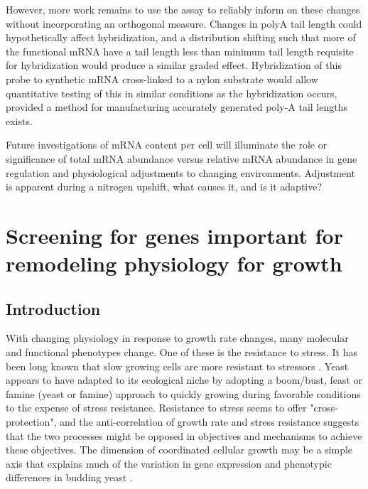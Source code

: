 However, more work remains to use the assay to reliably inform on
these changes without incorporating an orthogonal measure.
Changes in polyA tail length could hypothetically affect
hybridization, and a distribution shifting such that more of the
functional mRNA have a tail length less than minimum tail length
requisite for hybridization would produce a similar graded effect.
Hybridization of this probe to synthetic mRNA cross-linked to a nylon
substrate would allow quantitative testing of this in similar
conditions as the hybridization occurs, provided a method for
manufacturing accurately generated poly-A tail lengths exists.

Future investigations of mRNA content per cell will illuminate
the role or significance of total mRNA abundance 
versus relative mRNA abundance in gene regulation and physiological
adjustments to changing environments. Adjustment is apparent during a 
nitrogen upshift, what causes it, and is it adaptive?

\section{Screening for genes important for remodeling physiology for
growth}

\subsection{Introduction}

With changing physiology in response to growth rate changes, many
molecular and functional phenotypes change. One of these is the
resistance to stress. 
It has been long known that slow growing cells are more resistant to
stressors \parencite{??}.
Yeast appears to have adapted to its ecological niche by adopting a
boom/bust, feast or famine (yeast or famine) approach to quickly
growing during favorable conditions to the expense of stress
resistance. 
Resistance to stress seems to offer "cross-protection", and the
anti-correlation of growth rate and stress resistance suggests that
the two processes might be opposed in objectives and mechanisms to
achieve these objectives.
The dimension of coordinated cellular growth may be a simple axis that
explains much of the variation in gene expression and phenotypic
differences in budding yeast \parencite{kemmeren, brauer, libotstein}.


